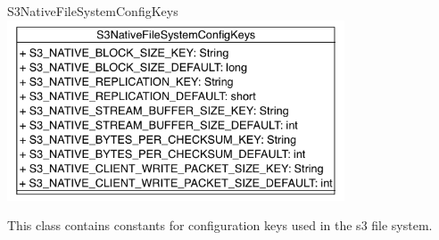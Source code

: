 \begin{XeClass}{S3NativeFileSystemConfigKeys}
\includegraphics[width=10cm]{cdig/S3NativeFileSystemConfigKeys.png}
     
 This class contains constants for configuration keys used
 in the s3 file system. 

\end{XeClass}
